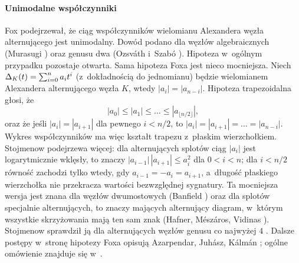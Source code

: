 \paragraph{Unimodalne współczynniki}
Fox \cite{fox1962} podejrzewał, że
%
%
ciąg współczynników wielomianu Alexandera węzła alternującego jest unimodalny.
Dowód podano dla węzłów algebraicznych (Murasugi \cite{murasugi1985}) oraz genusu dwa (Ozsváth i~Szabó \cite{ozsvath2003}).
%
%
%
Hipoteza w~ogólnym przypadku pozostaje otwarta.
Sama hipoteza Foxa \cite[problem 12]{fox1962} jest nieco mocniejsza.
Niech $\Delta_K(t) = \sum_{i=0}^n a_i t^i$ (z~dokładnością do jednomianu) będzie wielomianem Alexandera alternującego węzła $K$, wtedy $|a_i| = |a_{n-i}|$.
Hipoteza trapezoidalna głosi, że
\begin{equation}
    |a_0| \le |a_1| \le \ldots \le |a_{\lfloor n/2 \rfloor}|,
\end{equation}
oraz że jeśli $|a_i| = |a_{i+1}|$ dla pewnego $i < n/2$, to $|a_i| = |a_{i+1}| = \ldots = |a_{n-i}|$.
Wykres współczynników ma więc kształt trapezu z~płaskim wierzchołkiem.
Stojmenow \cite{stoimenowb2005} podejrzewa więcej: dla alternujących splotów ciąg $|a_i|$ jest logarytmicznie wklęsły, to znaczy $|a_{i-1}| \, |a_{i+1}| \le a_i^2$ dla $0 < i < n$; dla $i < n/2$ równość zachodzi tylko wtedy, gdy $a_{i-1} = -a_i = a_{i+1}$, a~długość płaskiego wierzchołka nie przekracza wartości bezwzględnej sygnatury.
%
%
Ta mocniejsza wersja jest znana dla węzłów dwumostowych (Banfield \cite{banfield2022}) oraz dla splotów specjalnie alternujących, to znaczy mających alternujący diagram, w~którym wszystkie skrzyżowania mają ten sam znak (Hafner, Mészáros, Vidinas \cite{hafner2024}).
Stojmenow sprawdził ją dla alternujących węzłów genusu co najwyżej $4$ \cite[sekcja 9.2]{stoimenow2016}.
%
%
%
%
Dalsze postępy w~stronę hipotezy Foxa opisują Azarpendar, Juhász, Kálmán \cite{azarpendar2024}; ogólne omówienie znajduje się w~\cite[problem 1.7]{baykur2026}.
%
%
%


